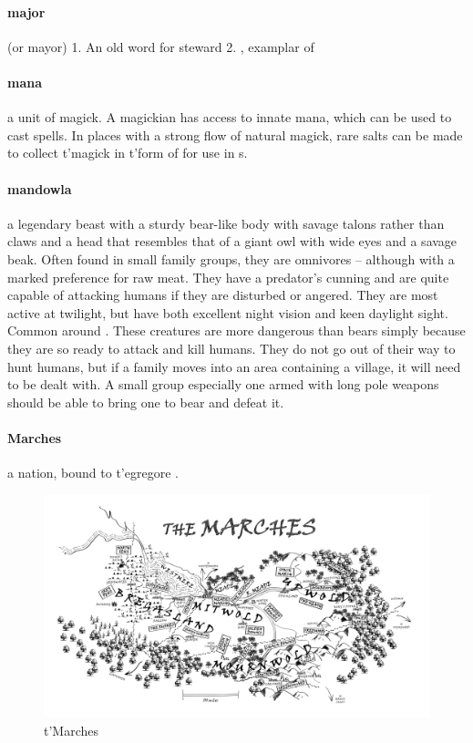 \paragraph{major} (or mayor) 1. An old  word for steward 2. , examplar of 
\paragraph{mana} a unit of magick. A magickian has access to innate mana, which can be used to cast spells. In places with a strong flow of natural magick, rare salts can be made to collect t'\allowbreak magick in t'\allowbreak form of  for use in s.
\paragraph{mandowla} a legendary beast with a sturdy bear-like body with savage talons rather than claws and a head that resembles that of a giant owl with wide eyes and a savage beak. Often found in small family groups, they are omnivores – although with a marked preference for raw meat. They have a predator's cunning and are quite capable of attacking humans if they are disturbed or angered. They are most active at twilight, but have both excellent night vision and keen daylight sight. Common around . These creatures are more dangerous than bears simply because they are so ready to attack and kill humans. They do not go out of their way to hunt humans, but if a family moves into an area containing a village, it will need to be dealt with. A small group especially one armed with long pole weapons should be able to bring one to bear and defeat it.
\paragraph{Marches} a nation, bound to t'\allowbreak egregore . \begin{figure}\centering\includegraphics[width=1.1\textwidth]{encyclopedia/marches}\caption{t'Marches}\end{figure}

